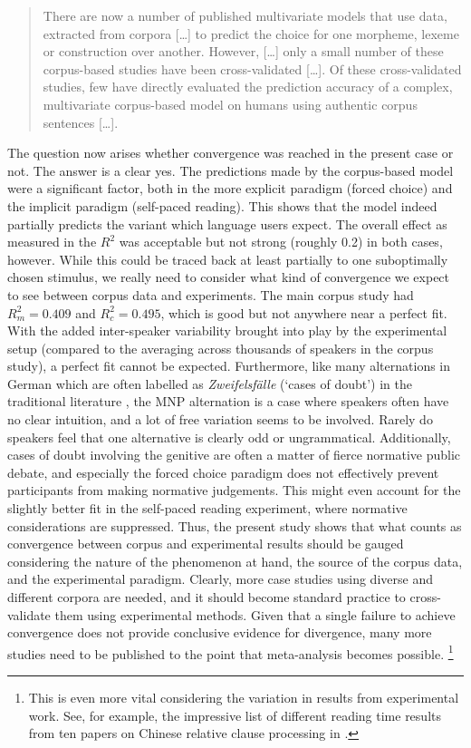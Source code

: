 \begin{quote}
  There are now a number of published multivariate models that use data, extracted from corpora [\ldots] to predict the choice for one morpheme, lexeme or construction over another.
  However, [\ldots] only a small number of these corpus-based studies have been cross-validated [\ldots].
  Of these cross-validated studies, few have directly evaluated the prediction accuracy of a complex, multivariate corpus-based model on humans using authentic corpus sentences [\ldots].
\end{quote}

The question now arises whether convergence was reached in the present case or not.
The answer is a clear yes.
The predictions made by the corpus-based model were a significant factor, both in the more explicit paradigm (forced choice) and the implicit paradigm (self-paced reading).
This shows that the model indeed partially predicts the variant which language users expect.
The overall effect as measured in the $R^2$ was acceptable but not strong (roughly 0.2) in both cases, however.
While this could be traced back at least partially to one suboptimally chosen stimulus, we really need to consider what kind of convergence we expect to see between corpus data and experiments.
The main corpus study had $R^2_m=0.409$ and $R^2_c=0.495$, which is good but not anywhere near a perfect fit.
With the added inter-speaker variability brought into play by the experimental setup (compared to the averaging across thousands of speakers in the corpus study), a perfect fit cannot be expected.
Furthermore, like many alternations in German which are often labelled as \textit{Zweifelsfälle} (`cases of doubt') in the traditional literature \citep{Duden09,Klein2009}, the MNP alternation is a case where speakers often have no clear intuition, and a lot of free variation seems to be involved.
Rarely do speakers feel that one alternative is clearly odd or ungrammatical.
Additionally, cases of doubt involving the genitive are often a matter of fierce normative public debate, and especially the forced choice paradigm does not effectively prevent participants from making normative judgements.
This might even account for the slightly better fit in the self-paced reading experiment, where normative considerations are suppressed.
Thus, the present study shows that what counts as convergence between corpus and experimental results should be gauged considering the nature of the phenomenon at hand, the source of the corpus data, and the experimental paradigm.
Clearly, more case studies using diverse and different corpora are needed, and it should become standard practice to cross-validate them using experimental methods.
Given that a single failure to achieve convergence does not provide conclusive evidence for divergence, many more studies need to be published to the point that meta-analysis becomes possible.%
\footnote{This is even more vital considering the variation in results from experimental work.
See, for example, the impressive list of different reading time results from ten papers on Chinese relative clause processing in \citet[8]{Vasishth2015}.}

